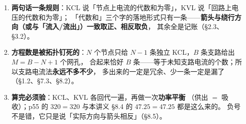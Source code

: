 \documentclass[11pt]{ctexart}
\begin{document}

\begin{enumerate}
\item \textbf{两句话一条规则}：KCL 说「节点上电流的代数和为零」，KVL 说「回路上电压的代数和为零」；
「代数和」三个字的落地形式只有一条——\textbf{箭头与绕行方向（或与「流入/流出」）一致取正、相反取负}，
其余全是记账（§2.3、§3.2）。
\item \textbf{方程数是被拓扑钉死的}：$N$ 个节点只给 $N-1$ 条独立 KCL，$B$ 条支路给出 $M=B-N+1$ 个网孔，
合起来恰好 $B$ 条——等于未知支路电流的个数；所以支路电流法\textbf{永远不多不少}，
多出来的一定是冗余、少一条一定是漏了（§1.2、§7.3、§8.2）。
\item \textbf{算完必须验}：KCL、KVL 各回代一遍，再做一次\textbf{功率平衡}
（供出 $=$ 吸收）；p55 的 $320=320$ 与本讲义 §8.4 的 $47.25=47.25$ 都是这么来的。
负号不是错，它只是说「实际方向与箭头相反」（§8.5）。
\end{enumerate}

\end{document}
